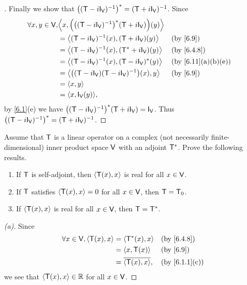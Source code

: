 \begin{proof}[]
  Finally we show that \(\pa{(\T - i \IT[\V])^{-1}}^* = (\T + i \IT[\V])^{-1}\).
  Since
  \begin{align*}
    \forall x, y \in \V, & \inn{x, \pa{\pa{(\T - i \IT[\V])^{-1}}^* (\T + i \IT[\V])}(y)}                                       \\
                         & = \inn{(\T - i \IT[\V])^{-1}(x), (\T + i \IT[\V])(y)}          &  & \text{(by \cref{6.9})}           \\
                         & = \inn{(\T - i \IT[\V])^{-1}(x), (\T^* + i \IT[\V])(y)}        &  & \text{(by \cref{6.4.8})}         \\
                         & = \inn{(\T - i \IT[\V])^{-1}(x), (\T - i \IT[\V])^*(y)}        &  & \text{(by \cref{6.11}(a)(b)(e))} \\
                         & = \inn{\pa{(\T - i \IT[\V]) (\T - i \IT[\V])^{-1}}(x), y}      &  & \text{(by \cref{6.9})}           \\
                         & = \inn{x, y}                                                                                         \\
                         & = \inn{x, \IT[\V](y)},
  \end{align*}
  by \cref{6.1}(e) we have \(\pa{(\T - i \IT[\V])^{-1}}^* (\T + i \IT[\V]) = \IT[\V]\).
  Thus \(\pa{(\T - i \IT[\V])^{-1}}^* = (\T + i \IT[\V])^{-1}\).
\end{proof}

\begin{ex}\label{ex:6.4.11}
  Assume that \(\mathsf{T}\) is a linear operator on a complex (not necessarily finite-dimensional) inner product space \(\mathsf{V}\) with an adjoint \(\mathsf{T}^*\).
  Prove the following results.
  \begin{enumerate}
    \item If \(\mathsf{T}\) is self-adjoint, then \(\left\langle\mathsf{T}(x), x\right\rangle\) is real for all \(x \in \mathsf{V}\).
    \item If \(\mathsf{T}\) satisfies \(\left\langle\mathsf{T}(x), x\right\rangle = 0\) for all \(x \in \mathsf{V}\), then \(\mathsf{T} = \mathsf{T}_0\).
    \item If \(\left\langle\mathsf{T}(x), x\right\rangle\) is real for all \(x \in \mathsf{V}\), then \(\mathsf{T} = \mathsf{T}^*\).
  \end{enumerate}
\end{ex}

\begin{proof}[(a)]
  Since
  \begin{align*}
    \forall x \in \V, \inn{\T(x), x} & = \inn{\T^*(x), x}       &  & \text{(by \cref{6.4.8})}    \\
                                     & = \inn{x, \T(x)}         &  & \text{(by \cref{6.9})}      \\
                                     & = \conj{\inn{\T(x), x}}, &  & \text{(by \cref{6.1.1}(c))}
  \end{align*}
  we see that \(\left\langle\mathsf{T}(x), x\right\rangle \in \mathbb{R}\) for all \(x \in \mathsf{V}\).
\end{proof}

